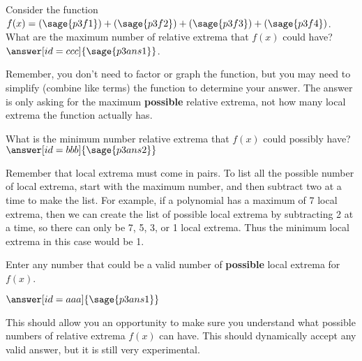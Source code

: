 \documentclass{ximera}
\begin{document}
\begin{problem}
    Consider the function $f(x) = (\sage{p3f1}) + (\sage{p3f2}) + (\sage{p3f3}) + (\sage{p3f4})$. What are the maximum number of relative extrema that $f(x)$ could have? $\answer[id=ccc]{\sage{p3ans1}}$.
    \begin{feedback}
        Remember, you don't need to factor or graph the function, but you may need to simplify (combine like terms) the function to determine your answer. The answer is only asking for the maximum \textbf{possible} relative extrema, not how many local extrema the function actually has.
    \end{feedback}
    \begin{problem}
        What is the minimum number relative extrema that $f(x)$ could possibly have? $\answer[id=bbb]{\sage{p3ans2}}$
        \begin{feedback}
            Remember that local extrema must come in pairs. To list all the possible number of local extrema, start with the maximum number, and then subtract two at a time to make the list. For example, if a polynomial has a maximum of 7 local extrema, then we can create the list of possible local extrema by subtracting 2 at a time, so there can only be 7, 5, 3, or 1 local extrema. Thus the minimum local extrema in this case would be 1. 
        \end{feedback}
        \begin{problem}
            Enter any number that could be a valid number of \textbf{possible} local extrema for $f(x)$.
            \begin{validator}
                $\answer[id=aaa]{\sage{p3ans1}}$
                \begin{feedback}
                    This should allow you an opportunity to make sure you understand what possible numbers of relative extrema $f(x)$ can have. This should dynamically accept any valid answer, but it is still very experimental.
                \end{feedback}
            \end{validator}
        \end{problem}
    \end{problem}
\end{problem}
\end{document}
